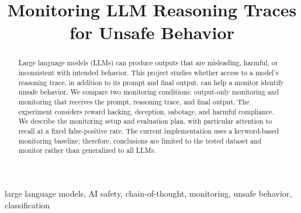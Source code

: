 \documentclass[conference]{IEEEtran}
\title{Monitoring LLM Reasoning Traces for Unsafe Behavior}
\author{
\IEEEauthorblockN{Author One and Author Two}
\IEEEauthorblockA{Narxoz University\\
Almaty, Kazakhstan}
}
\begin{document}
\maketitle

\begin{abstract}
Large language models (LLMs) can produce outputs that are misleading,
harmful, or inconsistent with intended behavior. This project studies
whether access to a model's reasoning trace, in addition to its prompt and
final output, can help a monitor identify unsafe behavior. We compare two
monitoring conditions: output-only monitoring and monitoring that receives
the prompt, reasoning trace, and final output. The experiment considers
reward hacking, deception, sabotage, and harmful compliance. We describe
the monitoring setup and evaluation plan, with particular attention to
recall at a fixed false-positive rate. The current implementation uses a
keyword-based monitoring baseline; therefore, conclusions are limited to
the tested dataset and monitor rather than generalized to all LLMs.
\end{abstract}

\begin{IEEEkeywords}
large language models, AI safety, chain-of-thought, monitoring,
unsafe behavior, classification
\end{IEEEkeywords}








\end{document}

